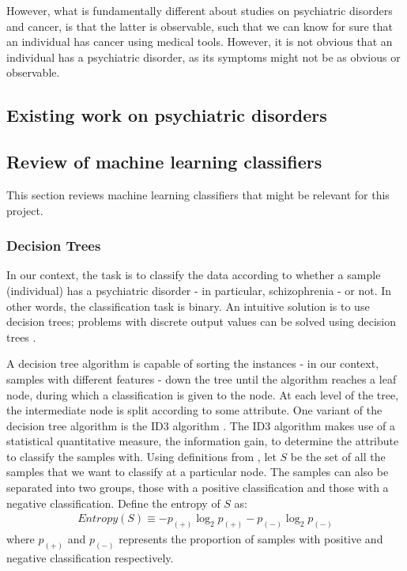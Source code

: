 \documentclass[12pt, twoside, a4paper]{article}
\begin{document}
However, what is fundamentally different about studies on psychiatric disorders and cancer, is that the latter is observable, such that we can know for sure that an individual has cancer using medical tools. However, it is not obvious that an individual has a psychiatric disorder, as its symptoms might not be as obvious or observable.

\subsection{Existing work on psychiatric disorders}

\subsection{Review of machine learning classifiers}
This section reviews machine learning classifiers that might be relevant for this project.

\subsubsection{Decision Trees}
In our context, the task is to classify the data according to whether a sample (individual) has a psychiatric disorder - in particular, schizophrenia - or not. In other words, the classification task is binary. An intuitive solution is to use decision trees; problems with discrete output values can be solved using decision trees \cite{RefWorks:98}.

A decision tree algorithm is capable of sorting the  instances - in our context, samples with different features - down the tree until the algorithm reaches a leaf node, during which a classification is given to the node. At each level of the tree, the intermediate node is split according to some attribute. One variant of the decision tree algorithm is the ID3 algorithm \cite{RefWorks:99}. The ID3 algorithm makes use of a statistical quantitative measure, the information gain, to determine the attribute to classify the samples with. Using definitions from \cite{RefWorks:98}, let $S$ be the set of all the samples that we want to classify at a particular node. The samples can also be separated into two groups, those with a positive classification and those with a negative classification. Define the entropy of $S$ as:
\begin{align*}
Entropy(S) \equiv -p_{(+)} \log_2 p_{(+)} - p_{(-)} \log_2 p_{(-)}
\end{align*}
where $p_{(+)}$ and $p_{(-)}$ represents the proportion of samples with positive and negative classification respectively.
\end{document}
